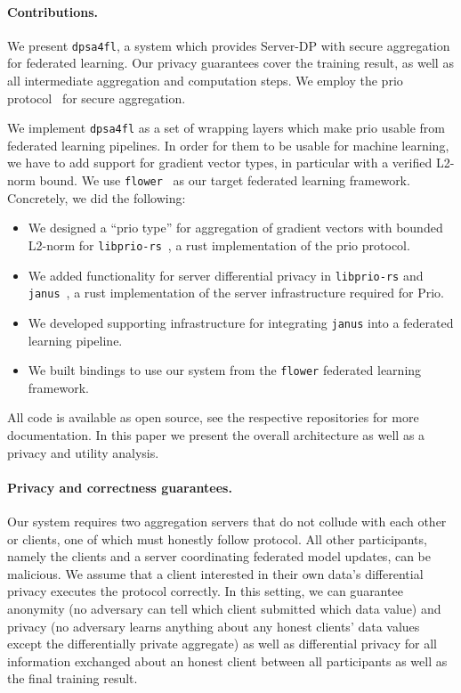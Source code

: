 \documentclass{article}
\begin{document}
\paragraph{Contributions.}
We present \texttt{dpsa4fl}, a system which provides Server-DP with
secure aggregation for federated learning. Our privacy guarantees cover the training
result, as well as all intermediate aggregation and computation steps. We employ the
prio protocol~\cite{prio} for secure aggregation.

We implement \texttt{dpsa4fl} as a set of wrapping layers which make prio usable
from federated learning pipelines. In order for
them to be usable for machine learning, we have to add support for gradient
vector types, in particular with a verified L2-norm bound. We use
\texttt{flower}~\cite{flower} as our target federated learning framework.
Concretely, we did the following:
\begin{itemize}
  \setlength\itemsep{0em}
\item We designed a ``prio type'' for aggregation of gradient vectors with
  bounded L2-norm for \texttt{libprio-rs}~\cite{libprio-rs}, a rust implementation
  of the prio protocol.
\item We added functionality for server differential privacy in
  \texttt{libprio-rs} and \texttt{janus}~\cite{janus}, a rust implementation of
  the server infrastructure required for Prio.
\item We developed supporting infrastructure for integrating \texttt{janus} into
  a federated learning pipeline.
\item We built bindings to use our system from the \texttt{flower} federated
  learning framework.
\end{itemize}
All code is available as open source, see the respective repositories\footnotemark{} for more
documentation. In this paper we present the overall architecture as well as a
privacy and utility analysis.


\paragraph{Privacy and correctness guarantees.}
Our system requires two aggregation servers that do not collude with each other or clients, one of which must honestly follow protocol. All other participants, namely the clients and a server coordinating federated model updates, can be malicious. We assume that a client interested in their own data's differential privacy executes the protocol correctly. In this setting, we can guarantee anonymity (no adversary can tell which client submitted which data value) and privacy (no adversary learns anything about any honest clients' data values except the differentially private aggregate) as well as differential privacy for all information exchanged about an honest client between all participants as well as the final training result.
\end{document}
